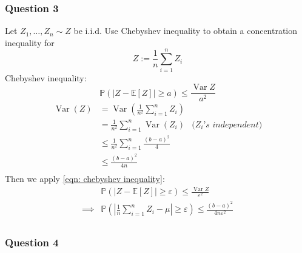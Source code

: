 \documentclass{article}
\newcommand{\E}{\mathbb{E}}
\renewcommand{\P}{\mathbb{P}}
\newcommand{\var}{\operatorname{Var}}
\begin{document}
\subsubsection{Question 3}
Let \(Z_1, \ldots, Z_n \sim Z\) be i.i.d. Use Chebyshev inequality to obtain a concentration inequality for
\begin{equation*}
  Z := \frac{1}{n} \sum_{i=1}^n Z_i
\end{equation*}
Chebyshev inequality:
\begin{equation}
  \label{eqn: chebyshev inequality}
  \P\left( |Z - \E[Z]| \geq a\right) \leq \frac{\var Z}{a^2}
\end{equation}
\begin{align*}
  \var\left(Z\right)
                                                  & =
  \var\left(\frac{1}{n^2}\sum_{i=1}^n Z_i\right)                                     \\
                                                  & =
  \frac{1}{n^2} \sum_{i=1}^n \var\left(Z_i\right) & \textit{(\(Z_i\)'s independent)} \\
                                                  & \leq
  \frac{1}{n^2} \sum_{i=1}^n \frac{\left(b-a\right)^2}{4}                            \\
                                                  & \leq
  \frac{\left(b-a\right)^2}{4n}                                                      \\
\end{align*}
Then we apply \eqref{eqn: chebyshev inequality}:
\begin{align*}
           &
  \P\left( |Z - \E[Z]| \geq \varepsilon \right) \leq \frac{\var Z}{\varepsilon^2}                                                    \\
  \implies &
  \P\left( \left| \frac{1}{n} \sum_{i=1}^n Z_i - \mu\right| \geq \varepsilon \right) \leq \frac{\left(b-a\right)^2}{4n\varepsilon^2} \\
\end{align*}

\subsubsection{Question 4}
\end{document}
